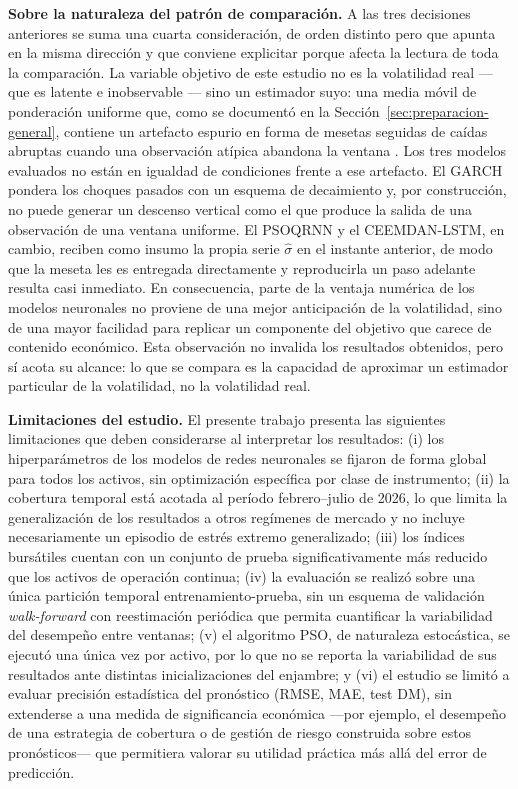 \documentclass[12pt]{paper}
\begin{document}
\textbf{Sobre la naturaleza del patrón de comparación.} A las tres decisiones anteriores se suma una cuarta consideración, de orden distinto pero que apunta en la misma dirección y que conviene explicitar porque afecta la lectura de toda la comparación. La variable objetivo de este estudio no es la volatilidad real --- que es latente e inobservable --- sino un estimador suyo: una media móvil de ponderación uniforme que, como se documentó en la Sección~\ref{sec:preparacion-general}, contiene un artefacto espurio en forma de mesetas seguidas de caídas abruptas cuando una observación atípica abandona la ventana \citep{wilmott2007quantfinance}. Los tres modelos evaluados no están en igualdad de condiciones frente a ese artefacto. El GARCH pondera los choques pasados con un esquema de decaimiento y, por construcción, no puede generar un descenso vertical como el que produce la salida de una observación de una ventana uniforme. El PSOQRNN y el CEEMDAN-LSTM, en cambio, reciben como insumo la propia serie $\hat{\sigma}$ en el instante anterior, de modo que la meseta les es entregada directamente y reproducirla un paso adelante resulta casi inmediato. En consecuencia, parte de la ventaja numérica de los modelos neuronales no proviene de una mejor anticipación de la volatilidad, sino de una mayor facilidad para replicar un componente del objetivo que carece de contenido económico. Esta observación no invalida los resultados obtenidos, pero sí acota su alcance: lo que se compara es la capacidad de aproximar un estimador particular de la volatilidad, no la volatilidad real.

\textbf{Limitaciones del estudio.} El presente trabajo presenta las siguientes limitaciones que deben considerarse al interpretar los resultados: (i) los hiperparámetros de los modelos de redes neuronales se fijaron de forma global para todos los activos, sin optimización específica por clase de instrumento; (ii) la cobertura temporal está acotada al período febrero--julio de 2026, lo que limita la generalización de los resultados a otros regímenes de mercado y no incluye necesariamente un episodio de estrés extremo generalizado; (iii) los índices bursátiles cuentan con un conjunto de prueba significativamente más reducido que los activos de operación continua; (iv) la evaluación se realizó sobre una única partición temporal entrenamiento-prueba, sin un esquema de validación \textit{walk-forward} con reestimación periódica que permita cuantificar la variabilidad del desempeño entre ventanas; (v) el algoritmo PSO, de naturaleza estocástica, se ejecutó una única vez por activo, por lo que no se reporta la variabilidad de sus resultados ante distintas inicializaciones del enjambre; y (vi) el estudio se limitó a evaluar precisión estadística del pronóstico (RMSE, MAE, test DM), sin extenderse a una medida de significancia económica —por ejemplo, el desempeño de una estrategia de cobertura o de gestión de riesgo construida sobre estos pronósticos— que permitiera valorar su utilidad práctica más allá del error de predicción.
\end{document}
